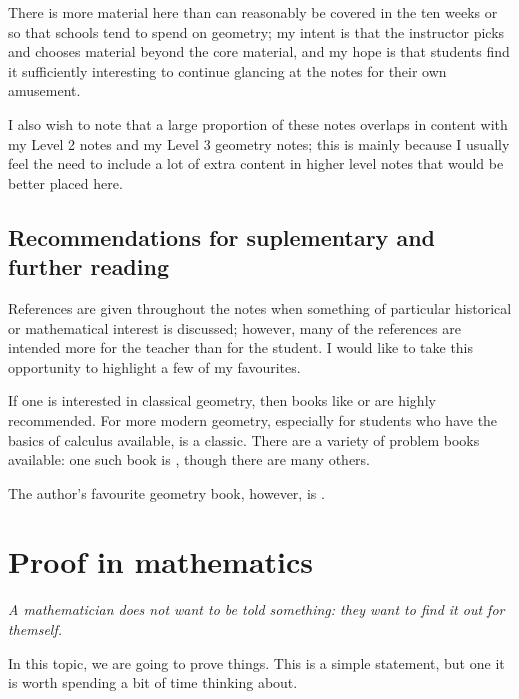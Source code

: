 \documentclass[a4paper]{report}
\theoremstyle{definition}
\begin{document}
  There is more material here than can reasonably be covered in the ten weeks or so that schools tend to spend on geometry; my intent is
  that the instructor picks and chooses material beyond the core material, and my hope is that students find it sufficiently interesting
  to continue glancing at the notes for their own amusement.

  I also wish to note that a large proportion of these notes overlaps in content with my Level 2 notes and my Level 3 geometry notes; this is
  mainly because I usually feel the need to include a lot of extra content in higher level notes that would be better placed here.

  \section*{Recommendations for suplementary and further reading}
  References are given throughout the notes when something of particular historical or mathematical interest is discussed; however, many
  of the references are intended more for the teacher than for the student. I would like to take this opportunity to highlight a few of
  my favourites.

  If one is interested in classical geometry, then books like \autocite{sved} or \autocite{coxeterRevisited} are highly recommended.
  For more modern geometry, especially for students who have the basics of calculus available, \autocite{coxeterIntro} is a classic.
  There are a variety of problem books available: one such book is \autocite{challenging}, though there are many others.

  The author's favourite geometry book, however, is \autocite{berger}.

  \setcounter{chapter}{-1}
  \chapter{Proof in mathematics}
  \begin{center}
    \begin{minipage}{0.7\textwidth}\itshape
      A mathematician does not want to be told something: they want to find it out for themself. \autocite[19]{sawyerPrelude}
    \end{minipage}
  \end{center}
  In this topic, we are going to prove things. This is a simple statement, but one it is worth spending a bit of time
  thinking about.
\end{document}
